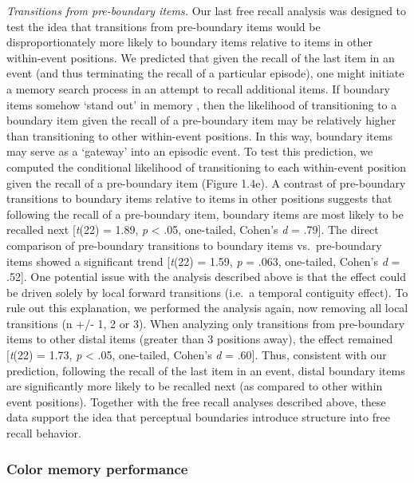 \emph{Transitions from pre-boundary items.} Our last free recall
analysis was designed to test the idea that transitions from
pre-boundary items would be disproportionately more likely to boundary
items relative to items in other within-event positions. We predicted
that given the recall of the last item in an event (and thus terminating
the recall of a particular episode), one might initiate a memory search
process in an attempt to recall additional items. If boundary items
somehow `stand out' in memory
\autocites{radvansky_across_2012}{zacks_event_2007}, then the likelihood
of transitioning to a boundary item given the recall of a pre-boundary
item may be relatively higher than transitioning to other within-event
positions. In this way, boundary items may serve as a `gateway' into an
episodic event. To test this prediction, we computed the conditional
likelihood of transitioning to each within-event position given the
recall of a pre-boundary item (Figure 1.4e). A contrast of pre-boundary
transitions to boundary items relative to items in other positions
suggests that following the recall of a pre-boundary item, boundary
items are most likely to be recalled next {[}\emph{t}(22) = 1.89,
\emph{p} \textless{} .05, one-tailed, Cohen's \emph{d} = .79{]}. The
direct comparison of pre-boundary transitions to boundary items
vs.~pre-boundary items showed a significant trend {[}\emph{t}(22) =
1.59, \emph{p} = .063, one-tailed, Cohen's \emph{d} = .52{]}. One
potential issue with the analysis described above is that the effect
could be driven solely by local forward transitions (i.e.~a temporal
contiguity effect). To rule out this explanation, we performed the
analysis again, now removing all local transitions (n +/- 1, 2 or 3).
When analyzing only transitions from pre-boundary items to other distal
items (greater than 3 positions away), the effect remained
{[}\emph{t}(22) = 1.73, \emph{p} \textless{} .05, one-tailed, Cohen's
\emph{d} = .60{]}. Thus, consistent with our prediction, following the
recall of the last item in an event, distal boundary items are
significantly more likely to be recalled next (as compared to other
within event positions). Together with the free recall analyses
described above, these data support the idea that perceptual boundaries
introduce structure into free recall behavior.

\subsubsection{Color memory performance}\label{color-memory-performance}

